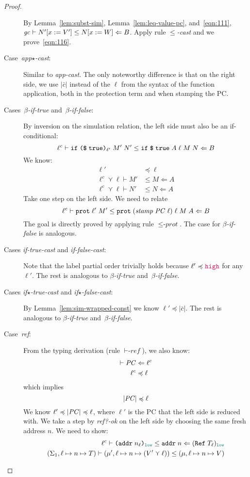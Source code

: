 \begin{proof}
\begin{description}
      By Lemma~\ref{lem:subst-sim}, Lemma~\ref{lem:leq-value-pc}, and~\eqref{eqn:111},
      ${\mathit{gc}}\vdash{N'[x:=V']}\leq{N[x:=W]}\Leftarrow{B}$.
      Apply rule ${\leq}$\textit{-cast} and we prove~\eqref{eqn:116}.
  \item[Case~\textit{app$\star$-cast}:] Similar to \textit{app-cast}.
  The only noteworthy difference is that on the right side, we use $|\bar{c}|$ instead of the
  $\ell$ from the syntax of the function application, both in the protection term
  and when stamping the PC.
  \item[Cases~$\beta$\textit{-if-true} and~$\beta$\textit{-if-false}:]
  By inversion on the simulation relation, the left side must also
  be an if-conditional:
  \[
  {\ell^c}\vdash{\ensuremath{\text{\texttt{{if}}}\;{\text{\texttt{{(\$}}}\;{\mathtt{true}}\text{\texttt{{)}}}_{\ell'}}\;{M'}\;{N'}}}\leq{\ensuremath{\text{\texttt{{if}}}\;{\text{\texttt{{\$}}}\;{\mathtt{true}}}\;{A}\;{\ell}\;{M}\;{N}}}\Leftarrow{B}
  \]
  We know:
  \begin{align}
  \ell' &\preccurlyeq \ell \\
  \ell^c \curlyvee \ell \vdash M' &\leq M \Leftarrow A \\
  \ell^c \curlyvee \ell \vdash N' &\leq N \Leftarrow A
  \end{align}
  Take one step on the left side. We need to relate
  \[
  {\ell^c}\vdash{\ensuremath{\text{\texttt{{prot}}}\;{\ell'}\;{M'}}}\leq{\ensuremath{\text{\texttt{{prot}}}\;{(\mathit{stamp}\;\mathit{PC}\;\ell)}\;{\ell}\;{M}\;{A}}}\Leftarrow{B}
  \]
  The goal is directly proved by applying rule ${\leq}\textit{-prot}$.
  The case for $\beta$\textit{-if-false} is analogous.
  \item[Cases \textit{if-true-cast} and \textit{if-false-cast}:]
  Note that the label partial order trivially holds because $\ell' \preccurlyeq \high$
  for any $\ell'$. The rest is analogous to $\beta$\textit{-if-true} and~$\beta$\textit{-if-false}.
  \item[Cases \textit{if$\star$-true-cast} and \textit{if$\star$-false-cast}:]
  By Lemma~\ref{lem:sim-wrapped-const} we know $\ell' \preccurlyeq |\bar{c}|$.
  The rest is analogous to $\beta$\textit{-if-true} and~$\beta$\textit{-if-false}.
  \item[Case~\textit{ref}:]
  From the typing derivation (rule ${\vdash}\textit{-ref}$), we also know:
  \begin{align}
  \vdash \mathit{PC} &\Leftarrow \ell^c \\
  \ell^c &\preccurlyeq \ell
  \end{align}
  which implies
  \begin{equation}
  |\mathit{PC}| \preccurlyeq \ell
  \end{equation}
  We know $\ell' \preccurlyeq |\mathit{PC}| \preccurlyeq \ell$, where $\ell'$ is the PC that the left side is reduced with.
  We take a step by \textit{ref?-ok} on the left side by choosing the same fresh address $n$. We need to show:
  \begin{align}
  \simrel{\ell^c}{\dynaddr{n_\ell}{\low}}{\ccaddr{n}}{(\Refer{T_\ell})_{\low}}  \label{eqn:120} \\
  (\Sigma_1, \ell \mapsto n \mapsto T) \vdash (\mu', \ell \mapsto n \mapsto (V' \curlyvee \ell)) \leq (\mu, \ell \mapsto n \mapsto V)  \label{eqn:121}
  \end{align}


\end{description}
\end{proof}
